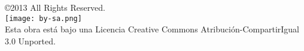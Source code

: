 \null
\vfill
\begin{flushleft}
\copyright 2013 All Rights Reserved.\\
\texttt{[image: by-sa.png]}\\
Esta obra est\'a bajo una Licencia Creative Commons Atribuci\'on-CompartirIgual 3.0 Unported.
\end{flushleft}

\newpage